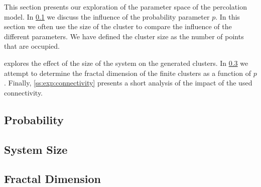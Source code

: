 This section presents our exploration of the parameter space of the percolation model. In \cref{ss:exp:probability} we discuss the influence of the probability parameter $p$. In this section we often use the size of the cluster to compare the influence of the different parameters. We have defined the cluster size as the number of points that are occupied. 

 explores the effect of the size of the system on the generated clusters. In \cref{ss:exp:fractal} we attempt to determine the fractal dimension of the finite clusters as a function of $p$. Finally, \cref{ss:exp:connectivity} presents a short analysis of the impact of the used connectivity.


\subsection{Probability}
\label{ss:exp:probability}


\subsection{System Size}
\label{ss:exp:systemSize}


\subsection{Fractal Dimension}
\label{ss:exp:fractal}
	

% 
